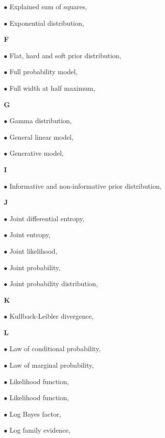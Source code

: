 \documentclass[a4paper,12pt,twoside]{book}
\begin{document}
$\bullet$ Explained sum of squares, \pageref{sec:ess}

$\bullet$ Exponential distribution, \pageref{sec:exp}


\vspace{1em}
\textbf{F}

$\bullet$ Flat, hard and soft prior distribution, \pageref{sec:prior-flat}

$\bullet$ Full probability model, \pageref{sec:fpm}

$\bullet$ Full width at half maximum, \pageref{sec:fwhm}


\vspace{1em}
\textbf{G}

$\bullet$ Gamma distribution, \pageref{sec:gam}

$\bullet$ General linear model, \pageref{sec:glm}

$\bullet$ Generative model, \pageref{sec:gm}


\vspace{1em}
\textbf{I}

$\bullet$ Informative and non-informative prior distribution, \pageref{sec:prior-inf}


\vspace{1em}
\textbf{J}

$\bullet$ Joint differential entropy, \pageref{sec:dent-joint}

$\bullet$ Joint entropy, \pageref{sec:ent-joint}

$\bullet$ Joint likelihood, \pageref{sec:jl}

$\bullet$ Joint probability, \pageref{sec:prob-joint}

$\bullet$ Joint probability distribution, \pageref{sec:dist-joint}


\vspace{1em}
\textbf{K}

$\bullet$ Kullback-Leibler divergence, \pageref{sec:kl}


\vspace{1em}
\textbf{L}

$\bullet$ Law of conditional probability, \pageref{sec:prob-cond}

$\bullet$ Law of marginal probability, \pageref{sec:prob-marg}

$\bullet$ Likelihood function, \pageref{sec:lf}

$\bullet$ Likelihood function, \pageref{sec:lf}

$\bullet$ Log Bayes factor, \pageref{sec:lbf}

$\bullet$ Log family evidence, \pageref{sec:lfe}
\end{document}
